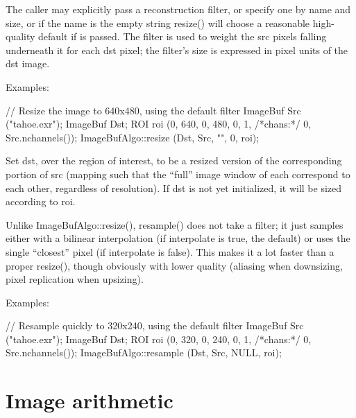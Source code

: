 The caller may explicitly pass a reconstruction filter, or specify one by
name and size, or if the name is the empty string {\cf resize()} will choose
a reasonable high-quality default if \NULL is passed.  The filter is used to
weight the {\cf src} pixels falling underneath it for each {\cf dst} pixel;
the filter's size is expressed in pixel units of the dst image.

\smallskip
\noindent Examples:
\begin{code}
    // Resize the image to 640x480, using the default filter
    ImageBuf Src ("tahoe.exr");
    ImageBuf Dst;
    ROI roi (0, 640, 0, 480, 0, 1, /*chans:*/ 0, Src.nchannels());
    ImageBufAlgo::resize (Dst, Src, "", 0, roi);
\end{code}
\apiend


 
Set {\cf dst}, over the region of interest, to be a resized version of the
corresponding portion of {\cf src} (mapping such that the ``full'' image
window of each correspond to each other, regardless of resolution).  If
{\cf dst} is not yet initialized, it will be sized according to {\cf roi}.

Unlike {\cf ImageBufAlgo::resize()}, {\cf resample()} does not take a filter; it
just samples either with a bilinear interpolation (if {\cf interpolate} is
{\cf true}, the default) or uses the single ``closest'' pixel (if
{\cf interpolate} is {\cf false}).  This makes it a lot faster than a proper
{\cf resize()}, though obviously with lower quality (aliasing when
downsizing, pixel replication when upsizing).

\smallskip
\noindent Examples:
\begin{code}
    // Resample quickly to 320x240, using the default filter
    ImageBuf Src ("tahoe.exr");
    ImageBuf Dst;
    ROI roi (0, 320, 0, 240, 0, 1, /*chans:*/ 0, Src.nchannels());
    ImageBufAlgo::resample (Dst, Src, NULL, roi);
\end{code}
\apiend



\section{Image arithmetic}
\label{sec:iba:arith}

